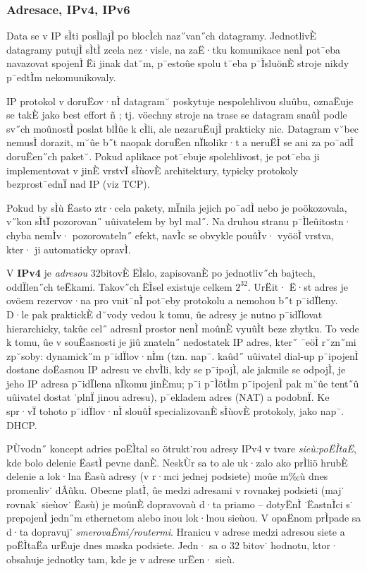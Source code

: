 \subsubsection*{Adresace, IPv4, IPv6}
Data se v IP sÌti posÌlajÌ po blocÌch naz˝van˝ch datagramy. JednotlivÈ datagramy putujÌ sÌtÌ zcela nez·visle, na zaË·tku komunikace nenÌ pot¯eba navazovat spojenÌ Ëi jinak  dat˘m, p¯estoûe spolu t¯eba p¯ÌsluönÈ stroje nikdy p¯edtÌm nekomunikovaly.

IP protokol v doruËov·nÌ datagram˘ poskytuje nespolehlivou sluûbu, oznaËuje se takÈ jako best effort ñ ; tj. vöechny stroje na trase se datagram snaûÌ podle sv˝ch moûnostÌ poslat blÌûe k cÌli, ale nezaruËujÌ prakticky nic. Datagram v˘bec nemusÌ dorazit, m˘ûe b˝t naopak doruËen nÏkolikr·t a neruËÌ se ani za po¯adÌ doruËen˝ch paket˘. Pokud aplikace pot¯ebuje spolehlivost, je pot¯eba ji implementovat v jinÈ vrstvÏ sÌùovÈ architektury, typicky protokoly bezprost¯ednÏ nad IP (viz TCP).

Pokud by sÌù Ëasto ztr·cela pakety, mÏnila jejich po¯adÌ nebo je poökozovala, v˝kon sÌtÏ pozorovan˝ uûivatelem by byl mal˝. Na druhou stranu p¯Ìleûitostn· chyba nemÌv· pozorovateln˝ efekt, navÌc se obvykle pouûÌv· vyööÌ vrstva, kter· ji automaticky opravÌ.

V \textbf{IPv4} je \emph{adresou} 32bitovÈ ËÌslo, zapisovanÈ po jednotliv˝ch bajtech, oddÏlen˝ch teËkami. Takov˝ch ËÌsel existuje celkem $2^{32}$. UrËit· Ë·st adres je ovöem rezervov·na pro vnit¯nÌ pot¯eby protokolu a nemohou b˝t p¯idÏleny. D·le pak praktickÈ d˘vody vedou k tomu, ûe adresy je nutno p¯idÏlovat hierarchicky, takûe cel˝ adresnÌ prostor nenÌ moûnÈ vyuûÌt beze zbytku. To vede k tomu, ûe v souËasnosti je jiû znateln˝ nedostatek IP adres, kter˝ ¯eöÌ r˘zn˝mi zp˘soby: dynamick˝m p¯idÏlov·nÌm (tzn. nap¯. kaûd˝ uûivatel dial-up p¯ipojenÌ dostane doËasnou IP adresu ve chvÌli, kdy se p¯ipojÌ, ale jakmile se odpojÌ, je jeho IP adresa p¯idÏlena nÏkomu jinÈmu; p¯i p¯ÌötÌm p¯ipojenÌ pak m˘ûe tent˝û uûivatel dostat ˙plnÏ jinou adresu), p¯ekladem adres (NAT) a podobnÏ. Ke spr·vÏ tohoto p¯idÏlov·nÌ slouûÌ specializovanÈ sÌùovÈ protokoly, jako nap¯. DHCP.

PÙvodn˝ koncept adries poËÌtal so ötrukt˙rou adresy IPv4 v tvare \emph{sieù:poËÌtaË}, kde bolo delenie ËastÌ pevne danÈ. NeskÙr sa to ale uk·zalo ako prÌliö hrubÈ delenie a lok·lna Ëasù adresy (v r·mci jednej podsiete) moûe m‰ù dnes promenliv˙ dÂûku. Obecne platÌ, ûe medzi adresami v rovnakej podsieti (maj˙ rovnak˙ sieùov˙ Ëasù) je moûnÈ dopravovaù d·ta priamo -- dotyËnÌ ˙ËastnÌci s˙ prepojenÌ jedn˝m ethernetom alebo inou lok·lnou sieùou. V opaËnom prÌpade sa d·ta dopravuj˙ \emph{smerovaËmi/routermi}. Hranicu v adrese medzi adresou siete a poËÌtaËa urËuje dnes maska podsiete. Jedn· sa o 32 bitov˙ hodnotu, ktor· obsahuje jednotky tam, kde je v adrese urËen· sieù.

